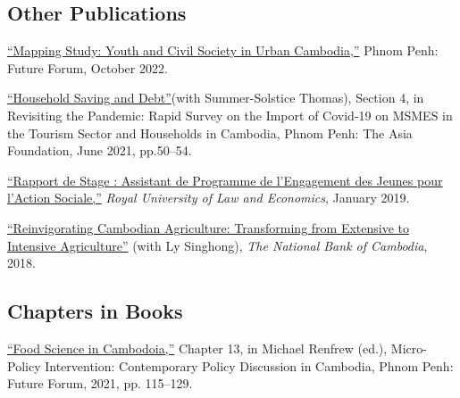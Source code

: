 \documentclass[10pt,a4paper]{article}
\begin{document}

\subsection*{Other Publications}



	\href{}{``Mapping Study: Youth and Civil Society in Urban Cambodia,”} Phnom Penh: Future Forum, October 2022.\\ \vspace{-.5em} 
	
	\href{https://kosalnith.github.io/research/policies/COVID-19-HHSavingsDebt.pdf}{``Household Saving and Debt”}(with Summer-Solstice Thomas), Section 4, in Revisiting the Pandemic: Rapid Survey on the Import of Covid-19 on MSMES in the Tourism Sector and Households in Cambodia, Phnom Penh: The Asia Foundation, June 2021, pp.50--54.\\ \vspace{-.5em} 
			
	\href{https://www.researchgate.net/publication/330936932_Rapport_du_Stage_Assistant_de_Programme_a_l%27YRDP}{``Rapport de Stage : Assistant de Programme de l'Engagement des Jeunes pour l'Action Sociale,”} \textit{Royal University of Law and Economics}, January 2019. \\ \vspace{-.5em}
			
	\href{https://ideas.repec.org/p/pra/mprapa/93086.html}{``Reinvigorating Cambodian Agriculture: Transforming from Extensive to Intensive Agriculture”} (with Ly Singhong), \textit{The National Bank of Cambodia}, 2018. \\ \vspace{-.5em}
			
\subsection*{Chapters in Books}

\href{https://kosalnith.github.io/research/policies/PolicyBrief-FST.pdf}{``Food Science in Cambodoia,''} Chapter 13, in Michael Renfrew (ed.), Micro-Policy Intervention: Contemporary Policy Discussion in Cambodia, Phnom Penh: Future Forum, 2021, pp. 115–129. 
\end{document}
